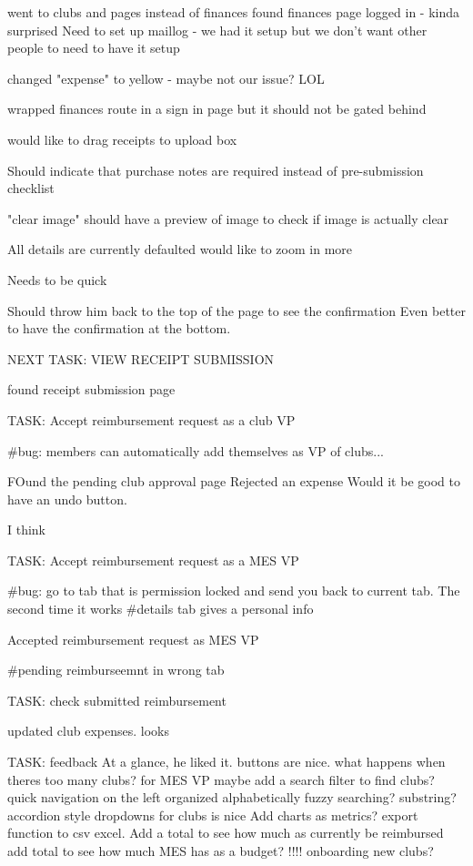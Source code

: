 went to clubs and pages instead of finances
found finances page
logged in - kinda surprised
Need to set up maillog - we had it setup but we don't want other people to need to have it setup

changed "expense" to yellow - maybe not our issue? LOL

wrapped finances route in a sign in page but it should not be gated behind

would like to drag receipts to upload box

Should indicate that purchase notes are required instead of pre-submission checklist

"clear image" should have a preview of image to check if image is actually clear

All details are currently defaulted
would like to zoom in more

Needs to be quick

Should throw him back to the top of the page to see the confirmation
    Even better to have the confirmation at the bottom.

NEXT TASK: VIEW RECEIPT SUBMISSION

found receipt submission page

TASK: Accept reimbursement request as a club VP

#bug: members can automatically add themselves as VP of clubs...

FOund the pending club approval page
Rejected an expense 
Would it be good to have an undo button.

I think 

TASK: Accept reimbursement request as a MES VP

#bug: go to tab that is permission locked and send you back to current tab. The second time it works
#details tab gives a  personal info

Accepted reimbursement request as MES VP

#pending reimburseemnt in wrong tab 

TASK: check submitted reimbursement

updated club expenses. looks 

TASK: feedback
At a glance, he liked it.
buttons are nice.
what happens when theres too many clubs? for MES VP
    maybe add a search filter to find clubs?
    quick navigation on the left organized alphabetically
    fuzzy searching? substring?
    accordion style dropdowns for clubs is nice
    Add charts as metrics?
        export function to csv excel.
    Add a total to see how much as currently be reimbursed
    add total to see how much MES has as a budget?
!!!! onboarding new clubs?